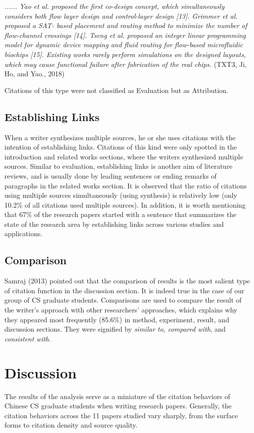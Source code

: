 \textit{...... Yao et al. proposed the first co-design concept, which simultaneously considers both flow layer design and control-layer design [13]. Grimmer et al. proposed a SAT- based placement and routing method to minimize the number of flow-channel crossings [14]. Tseng et al. proposed an integer linear programming model for dynamic device mapping and fluid routing for flow-based microfluidic biochips [15]. Existing works rarely perform simulations on the designed layouts, which may cause functional failure after fabrication of the real chips.} (TXT3, Ji, Ho, and Yao., 2018)

Citations of this type were not classified as Evaluation but as Attribution.

\subsection{Establishing Links}
When a writer synthesizes multiple sources, he or she uses citations with the intention of establishing links. Citations of this kind were only spotted in the introduction and related works sections, where the writers synthesized multiple sources. Similar to evaluation, establishing links is another aim of literature reviews, and is usually done by leading sentences or ending remarks of paragraphs in the related works section. It is observed that the ratio of citations using multiple sources simultaneously (using synthesis) is relatively low (only 10.2\% of all citations used multiple sources). In addition, it is worth mentioning that 67\% of the research papers started with a sentence that summarizes the state of the research area by establishing links across various studies and applications.

\subsection{Comparison}
Samraj (2013) pointed out that the comparison of results is the most salient type of citation function in the discussion section. It is indeed true in the case of our group of CS graduate students. Comparisons are used to compare the result of the writer’s approach with other researchers’ approaches, which explains why they appeared most frequently (85.6\%) in method, experiment, result, and discussion sections. They were signified by \textit{similar to, compared with}, and \textit{consistent with}.

\section{Discussion}
The results of the analysis serve as a miniature of the citation behaviors of Chinese CS graduate students when writing research papers. Generally, the citation behaviors across the 11 papers studied vary sharply, from the surface forms to citation density and source quality.

